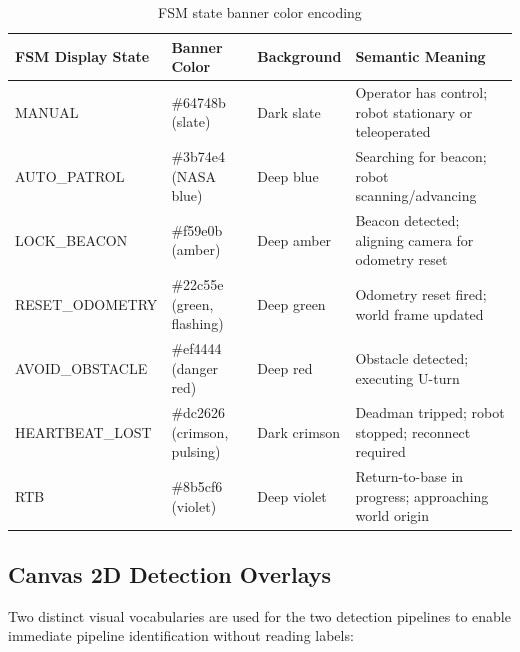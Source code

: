 \begin{table}[htbp]
\centering
\caption{FSM state banner color encoding}
\label{tab:fsm-colors}
\small
\begin{tabular}{@{}p{2.8cm}p{2.6cm}p{2cm}p{5.4cm}@{}}
\toprule
FSM Display State & Banner Color & Background & Semantic Meaning \\
\midrule
MANUAL & \#64748b (slate) & Dark slate & Operator has control; robot stationary or teleoperated \\
AUTO\_PATROL & \#3b74e4 (NASA blue) & Deep blue & Searching for beacon; robot scanning/advancing \\
LOCK\_BEACON & \#f59e0b (amber) & Deep amber & Beacon detected; aligning camera for odometry reset \\
RESET\_ODOMETRY & \#22c55e (green, flashing) & Deep green & Odometry reset fired; world frame updated \\
AVOID\_OBSTACLE & \#ef4444 (danger red) & Deep red & Obstacle detected; executing U-turn \\
HEARTBEAT\_LOST & \#dc2626 (crimson, pulsing) & Dark crimson & Deadman tripped; robot stopped; reconnect required \\
RTB & \#8b5cf6 (violet) & Deep violet & Return-to-base in progress; approaching world origin \\
\bottomrule
\end{tabular}
\end{table}

\subsection{Canvas 2D Detection Overlays}

Two distinct visual vocabularies are used for the two detection pipelines to enable immediate pipeline identification without reading labels:

